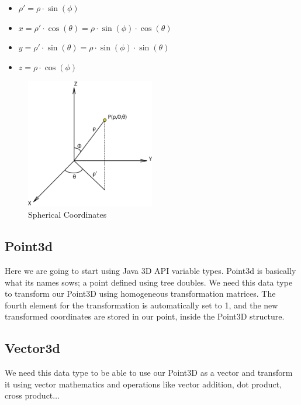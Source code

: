 \documentclass[12pt,a4paper,oneside,english]{book}
\begin{document}
\begin{itemize}
\item $\rho'=\rho\cdot\sin(\phi)$
\item $x=\rho'\cdot\cos(\theta)=\rho\cdot\sin(\phi)\cdot\cos(\theta)$
\item $y=\rho'\cdot\sin(\theta)=\rho\cdot\sin(\phi)\cdot\sin(\theta)$
\item $z=\rho\cdot\cos(\phi)$
\end{itemize}

\begin{figure}[htbp]
\begin{center}
\includegraphics[width=0.50\textwidth]{images/SC.png}
\caption{Spherical Coordinates}
\label{spherical coordinates}
\end{center}
\end{figure}

\newpage

\subsection{Point3d}

Here we are going to start using Java 3D API variable types. Point3d is basically what its names sows; a point defined using tree doubles. We need this data type to transform our Point3D using homogeneous transformation matrices. The fourth element for the transformation is automatically set to 1, and the new transformed coordinates are stored in our point, inside the Point3D structure.

\subsection{Vector3d}

We need this data type to be able to use our Point3D as a vector and transform it using vector mathematics and operations like vector addition, dot product, cross product$\dots$
\end{document}
